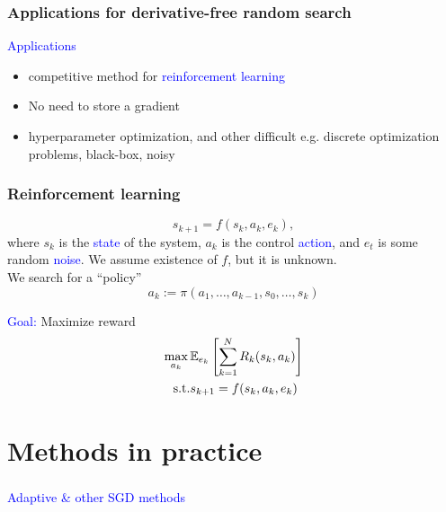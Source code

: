 \documentclass[aspectratio=149]{beamer}
\begin{document}
\begin{frame}
  \frametitle{Applications for derivative-free random search}

  \textcolor{blue}{Applications}
  \begin{itemize}
    \item competitive method for \textcolor{blue}{reinforcement learning}
    \item No need to store a gradient
    \item hyperparameter optimization, and other difficult e.g. discrete optimization
problems, black-box, noisy
  \end{itemize}
\end{frame}


\begin{frame}
  \frametitle{Reinforcement learning}
  \begin{equation}
    s_{k+1} = f(s_k, a_k, e_k),
  \end{equation}
  where $s_k$ is the \textcolor{blue}{state} of the system, $a_k$ is the control \textcolor{blue}{action}, and $e_t$ is some random \textcolor{blue}{noise}. We assume existence of $f$, but it is unknown.\\
  \medskip
  We search for a ``policy''
  \begin{equation}
    a_k := \pi(a_1, \dots, a_{k-1}, s_0, \dots, s_k)
  \end{equation}

  \medskip
  \textcolor{blue}{Goal:} Maximize reward
  \begin{equation}
    \begin{aligned}
       \max_{a_k}\, &\mathbb{E}_{e_k} \left[ \sum_{k=1}^N R_k(s_k, a_k)\right]\\
       \text{s.t.} & s_{k+1}=f(s_k, a_k, e_k)
    \end{aligned}
  \end{equation}
\end{frame}

\section{Methods in practice}%
\label{sec:}

\begin{frame}
  \frametitle{}
  \begin{center}
    \Huge\textcolor{blue}{Adaptive \& other SGD methods}\\
  \end{center}
\end{frame}
\end{document}
